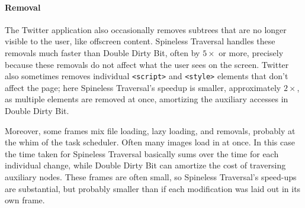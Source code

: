 \paragraph{Removal}
The Twitter application also occasionally removes
  subtrees that are no longer visible to the user,
  like offscreen content.
Spineless Traversal handles these removals
  much faster than Double Dirty Bit,
  often by $5\times$ or more,
  precisely because these removals
  do not affect what the user sees on the screen.
Twitter also sometimes removes
  individual \texttt{<script>} and \texttt{<style>} elements
  that don't affect the page;
  here Spineless Traversal's speedup
  is smaller, approximately $2\times$,
  as multiple elements are removed at once,
  amortizing the auxiliary accesses in Double Dirty Bit. 

Moreover,
  some frames mix file loading, lazy loading, and removals,
  probably at the whim of the task scheduler.
Often many images load in at once.
In this case the time taken for Spineless Traversal 
  basically sums over the time for each individual change,
  while Double Dirty Bit can amortize the cost
  of traversing auxiliary nodes.
These frames are often small,
  so Spineless Traversal's speed-ups are substantial,
  but probably smaller than if each modification
  was laid out in its own frame.
